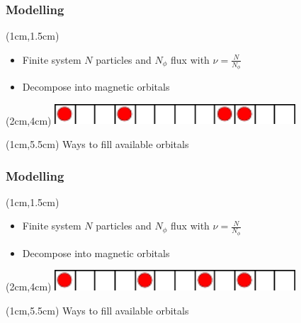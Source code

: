\documentclass[xcolor=pdftex,dvipsnames]{beamer}
\begin{document}
\begin{frame}[t]
    \frametitle{Modelling}
    \begin{textblock*}{12cm}(1cm,1.5cm) %
    \begin{itemize}
       \item Finite system $N$ particles and $N_{\phi}$ flux with $\nu = \frac{N}{N_{\phi}}$
       \item Decompose into magnetic orbitals
    \end{itemize}
    \end{textblock*}
    \begin{textblock*}{9cm}(2cm,4cm) %
        \includegraphics[width=9cm]{effective_1d_model}
    \end{textblock*}

    \begin{textblock*}{12cm}(1cm,5.5cm) %
    Ways to fill available orbitals
    \end{textblock*}
\end{frame}

\begin{frame}[t]
    \frametitle{Modelling}
    \begin{textblock*}{12cm}(1cm,1.5cm) %
    \begin{itemize}
       \item Finite system $N$ particles and $N_{\phi}$ flux with $\nu = \frac{N}{N_{\phi}}$
       \item Decompose into magnetic orbitals
    \end{itemize}
    \end{textblock*}
    \begin{textblock*}{9cm}(2cm,4cm) %
        \includegraphics[width=9cm]{effective_1d_model2}
    \end{textblock*}

    \begin{textblock*}{12cm}(1cm,5.5cm) %
    Ways to fill available orbitals
    \end{textblock*}
\end{frame}
\end{document}
